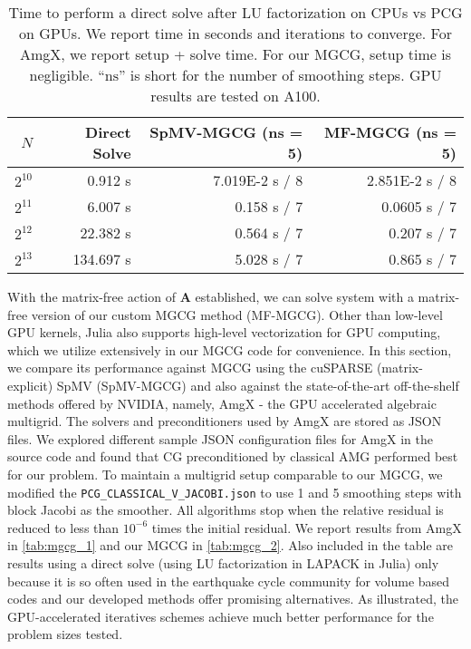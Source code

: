 \begin{table*}
    \caption{Time to perform a direct solve after LU factorization on CPUs vs PCG on GPUs. We report time in seconds and iterations to converge. For AmgX, we report setup + solve time. For our MGCG, setup time is negligible. ``$\mathrm{ns}$'' is short for the number of smoothing steps. GPU results are tested on A100.}
    \small
    \centering
    \begin{tabular}{rrrr}
    \toprule
    $N$     & Direct Solve  & SpMV-MGCG (ns = 5)   & MF-MGCG (ns = 5)\\
    \midrule
    $2^{10}$  &   0.912 s & 7.019E-2 s / 8   & 2.851E-2 s / 8       \\
    $2^{11}$ & 6.007 s &  0.158 s / 7  & 0.0605 s / 7     \\
    $2^{12}$ & 22.382 s  & 0.564 s / 7  & 0.207 s / 7         \\
    $2^{13}$ & 134.697 s  & 5.028 s / 7   & 0.865 s / 7      \\
    \bottomrule
    \end{tabular}
    \label{tab:mgcg_2} 
\end{table*}

With the matrix-free action of $\boldsymbol{A}$ established, we can solve system  with a matrix-free version of our custom MGCG method (MF-MGCG). 
Other than low-level GPU kernels, Julia also supports high-level vectorization for GPU computing, which we utilize extensively in our MGCG code for convenience.
In this section, we compare its performance against MGCG using the cuSPARSE (matrix-explicit) SpMV (SpMV-MGCG) and also against the state-of-the-art off-the-shelf methods offered by NVIDIA, namely, AmgX - the GPU accelerated algebraic multigrid. The solvers and preconditioners used by AmgX are stored as JSON files. 
We explored different sample JSON configuration files for AmgX in the source code and found that CG preconditioned by classical AMG performed best for our problem. 
To maintain a multigrid setup comparable to our MGCG, we modified the \texttt{PCG\_CLASSICAL\_V\_JACOBI.json} to use 1 and 5 smoothing steps with block Jacobi as the smoother.
All algorithms stop when the relative residual is reduced to less than $10^{-6}$ times the initial residual.
We report results from AmgX in \autoref{tab:mgcg_1} and our MGCG in \autoref{tab:mgcg_2}. Also included in the table are results using a direct solve (using LU factorization in LAPACK in Julia) only because it is so often used in the earthquake cycle community for volume based codes \citep{10.1785/0220190248} and our developed methods offer promising alternatives. As illustrated, the GPU-accelerated iteratives schemes achieve much better performance for the problem sizes tested.

